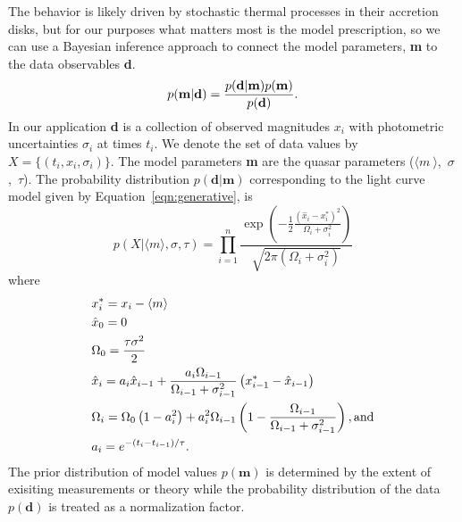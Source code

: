 \documentclass{emulateapj}
\begin{document}
The behavior is likely
driven by stochastic thermal processes in their accretion disks, but
for our purposes what matters most is the model prescription, so we
can use a Bayesian inference approach to connect the model parameters,
{\bf m} to the data observables {\bf d}.
\begin{equation}
p({\mathbf m} | {\mathbf d}) = 
{{p({\mathbf d} | {\mathbf m})p({\mathbf m})}
\over{p({\mathbf  d})}}. \nonumber 
\end{equation}
In our application {\bf d} is a collection of observed magnitudes ${x_{i}}$ with 
photometric uncertainties $\sigma_i$ at times ${t_i}$. We denote the set of data values by $X=\{(t_i,x_i,\sigma_i)\}$. The model parameters {\bf m} are 
the quasar parameters ($\langle m~\rangle$,~$\sigma$,~$\tau$). The probability distribution 
$p({\mathbf d} | {\mathbf m})$ corresponding to the light curve model given by Equation~\ref{eqn:generative}, 
is 
\begin{equation} 
p(X|\langle m\rangle, \sigma,\tau) =
\prod_{i=1}^{n}
\frac{
\exp\left(-\frac{1}{2}%
\frac{\left(\hat{x}_i-x^{*}_i\right)^2}{\Omega_i+\sigma_i^2} 
\right)
}
{
\sqrt{2\pi\left(\Omega_i+\sigma_i^2\right)}
}
\end{equation}
where 
\begin{alignat}{1}
& x_{i}^{*} = x_i-\langle m \rangle \nonumber\\
& \hat{x}_0 = 0   \nonumber\\
& \Omega_{0}=\frac{\tau\sigma^2}{2} \nonumber\\
& \hat{x}_i = a_i\hat{x}_{i-1} + \frac{a_i\Omega_{i-1}}{\Omega_{i-1}+\sigma^2_{i-1}} \left(x^{*}_{i-1}-\hat{x}_{i-1}\right) \nonumber\\
& \Omega_{i}=\Omega_{0}\left(1-a_{i}^2\right) +
a_{i}^2\Omega_{i-1}\left(1-\frac{\Omega_{i-1}}{\Omega_{i-1}+\sigma_{i-1}^2}\right),
{\rm and} \nonumber\\
& a_i = e^{-\left(t_i-t_{i-1}\right)/\tau}. \nonumber
\end{alignat}
The prior distribution of model values $p(\mathbf{m})$ is determined by the extent of exisiting measurements or theory while the probability distribution of the data $p(\mathbf{d})$ is treated as a normalization factor.
\end{document}
